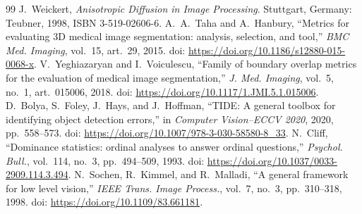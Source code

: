 \documentclass[11pt,a4paper]{article}
\begin{document}
\begin{thebibliography}{99}
 J.~Weickert, \emph{Anisotropic Diffusion in Image Processing}. Stuttgart, Germany: Teubner, 1998, ISBN 3-519-02606-6.
 A.~A.~Taha and A.~Hanbury, ``Metrics for evaluating 3D medical image segmentation: analysis, selection, and tool,'' \emph{BMC Med. Imaging}, vol.~15, art.~29, 2015. doi: \url{https://doi.org/10.1186/s12880-015-0068-x}.
 V.~Yeghiazaryan and I.~Voiculescu, ``Family of boundary overlap metrics for the evaluation of medical image segmentation,'' \emph{J. Med. Imaging}, vol.~5, no.~1, art.~015006, 2018. doi: \url{https://doi.org/10.1117/1.JMI.5.1.015006}.
 D.~Bolya, S.~Foley, J.~Hays, and J.~Hoffman, ``TIDE: A general toolbox for identifying object detection errors,'' in \emph{Computer Vision--ECCV 2020}, 2020, pp.~558--573. doi: \url{https://doi.org/10.1007/978-3-030-58580-8_33}.
 N.~Cliff, ``Dominance statistics: ordinal analyses to answer ordinal questions,'' \emph{Psychol. Bull.}, vol.~114, no.~3, pp.~494--509, 1993. doi: \url{https://doi.org/10.1037/0033-2909.114.3.494}.
 N.~Sochen, R.~Kimmel, and R.~Malladi, ``A general framework for low level vision,'' \emph{IEEE Trans. Image Process.}, vol.~7, no.~3, pp.~310--318, 1998. doi: \url{https://doi.org/10.1109/83.661181}.
\end{thebibliography}
\end{document}
